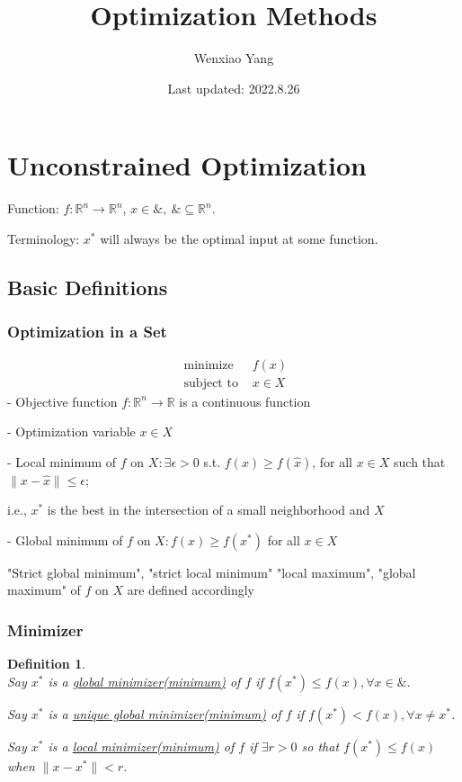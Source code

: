 \documentclass[11pt,a4paper]{article}
\title{Optimization Methods}
\author[*]{Wenxiao Yang}
\affil[*]{Department of Mathematics, University of Illinois at Urbana-Champaign}
\date{Last updated: 2022.8.26}
\newtheorem{definition}{Definition}
\begin{document}
\maketitle
\tableofcontents
\newpage

\section{Unconstrained Optimization}
Function: $f:\mathbb{R}^n \rightarrow	\mathbb{R}^n$, $x\in \&,\ \&\subseteq \mathbb{R}^n$.

Terminology: $x^*$ will always be the optimal input at some function.

\subsection{Basic Definitions}
\subsubsection{Optimization in a Set}
$$\begin{array}{ll}\text { minimize } & f(x) \\ \text { subject to } & x \in X\end{array}$$
- Objective function $f: \mathbb{R}^{n} \rightarrow \mathbb{R}$ is a continuous function

- Optimization variable $x \in X$

- Local minimum of $f$ on $X: \exists \epsilon>0$ s.t. $f(x) \geq f(\hat{x})$, for all $x \in X$ such that $\|x-\hat{x}\| \leq \epsilon$;

i.e., $x^{*}$ is the best in the intersection of a small neighborhood and $X$

- Global minimum of $f$ on $X: f(x) \geq f\left(x^{*}\right)$ for all $x \in X$

"Strict global minimum", "strict local minimum" "local maximum", "global maximum" of $f$ on $X$ are defined accordingly

\subsubsection{Minimizer}
\begin{definition}
    \quad\\
    Say $x^*$ is a \underline{global minimizer(minimum)} of $f$ if $f(x^*)\leq f(x), \forall x\in \&$.

    Say $x^*$ is a \underline{unique global minimizer(minimum)} of $f$ if $f(x^*)< f(x), \forall x\neq x^*$.

    Say $x^*$ is a \underline{local minimizer(minimum)} of $f$ if $\exists r>0$ so that $f(x^*)\leq f(x)$ when $\|x-x^*\|<r$.
\end{definition}
\end{document}
